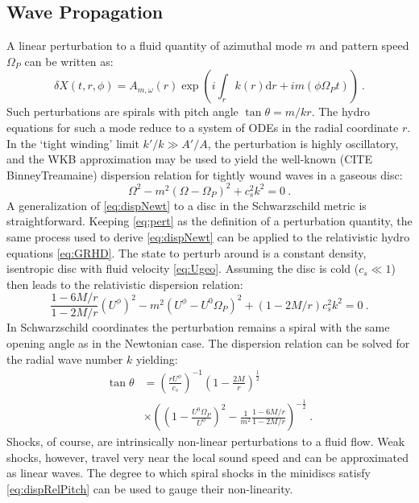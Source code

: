 \documentclass{emulateapj}
\newcommand{\dd}{\mbox{d}}
\begin{document}
\subsection{Wave Propagation}

A linear perturbation to a fluid quantity of azimuthal mode $m$ and pattern speed $\Omega_P$ can be written as:
\begin{equation}
	\delta X(t, r, \phi) = A_{m,\omega}(r) \exp \left( i \int_r k(r) \dd r  + i m (\phi \Omega_P t) \right)\ . \label{eq:pert}
\end{equation}
Such perturbations are spirals with pitch angle $\tan \theta = m / k r$. The hydro equations for such a mode reduce to a system of ODEs in the radial coordinate $r$.  In the `tight winding' limit $k' / k \gg A'/A$, the perturbation is highly oscillatory, and the WKB approximation may be used to yield the well-known (CITE BinneyTreamaine) dispersion relation for tightly wound waves in a gaseous disc:
\begin{equation}
	\Omega^2 - m^2(\Omega-\Omega_P)^2 + c_s^2 k^2 = 0 \ . \label{eq:dispNewt}
\end{equation}
A generalization of \eqref{eq:dispNewt} to a disc in the Schwarzschild metric is straightforward. Keeping \eqref{eq:pert} as the definition of a perturbation quantity, the same process used to derive \eqref{eq:dispNewt} can be applied to the relativistic hydro equations \eqref{eq:GRHD}. The state to perturb around is a constant density, isentropic disc with fluid velocity \eqref{eq:Ugeo}.  Assuming the disc is cold ($c_s \ll 1$) then leads to the relativistic dispersion relation:
\begin{equation}
	\frac{1-6M/r}{1-2M/r}\left(U^\phi\right)^2 - m^2(U^\phi-U^0\Omega_P)^2 + \left(1-2M/r\right) c_s^2 k^2 = 0 \ . \label{eq:dispRel}
\end{equation}
In Schwarzschild coordinates the perturbation remains a spiral with the same opening angle as in the Newtonian case.  The dispersion relation can be solved for the radial wave number $k$ yielding:
\begin{align}
	\tan \theta &= \left( \frac{r U^\phi}{c_s} \right)^{-1} \left(1-\frac{2M}{r}\right)^{\frac{1}{2}} \label{eq:dispRelPitch} \\ \nonumber
		&\times \left(\left(1- \frac{U^0 \Omega_P}{U^\phi}\right)^2 - \frac{1}{m^2}\frac{1-6M/r}{1-2M/r}\right)^{-\frac{1}{2}}\ . 
\end{align}
Shocks, of course, are intrinsically non-linear perturbations to a fluid flow.  Weak shocks, however, travel very near the local sound speed and can be approximated as linear waves.  The degree to which spiral shocks in the minidiscs satisfy \eqref{eq:dispRelPitch} can be used to gauge their non-linearity.  
\end{document}
